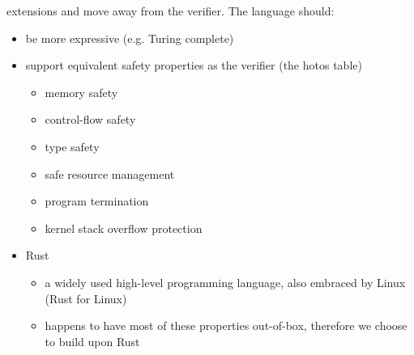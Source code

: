 \begin{itemize}
        extensions and move away from the verifier. The language should:
        \begin{itemize}
            \item be more expressive (e.g. Turing complete)
            \item support equivalent safety properties as the verifier (the
                hotos table)
                \begin{itemize}
                    \item memory safety
                    \item control-flow safety
                    \item type safety
                    \item safe resource management
                    \item program termination
                    \item kernel stack overflow protection
                \end{itemize}
            \item Rust
                \begin{itemize}
                    \item a widely used high-level programming language, also
                        embraced by Linux (Rust for Linux)
                    \item happens to have most of these properties out-of-box,
                        therefore we choose to build upon Rust
                \end{itemize}
        \end{itemize}
\end{itemize}
